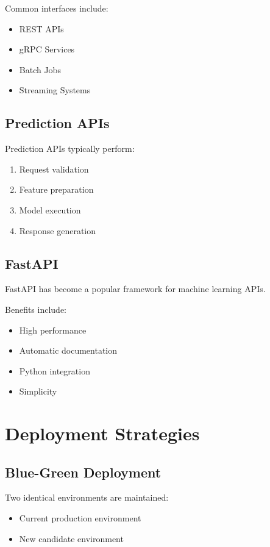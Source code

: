 Common interfaces include:

\begin{itemize}
    \item REST APIs
    \item gRPC Services
    \item Batch Jobs
    \item Streaming Systems
\end{itemize}

\subsection{Prediction APIs}

Prediction APIs typically perform:

\begin{enumerate}
    \item Request validation
    \item Feature preparation
    \item Model execution
    \item Response generation
\end{enumerate}

\subsection{FastAPI}

FastAPI has become a popular framework for machine learning APIs.

Benefits include:

\begin{itemize}
    \item High performance
    \item Automatic documentation
    \item Python integration
    \item Simplicity
\end{itemize}

\section{Deployment Strategies}

\subsection{Blue-Green Deployment}

Two identical environments are maintained:

\begin{itemize}
    \item Current production environment
    \item New candidate environment
\end{itemize}

